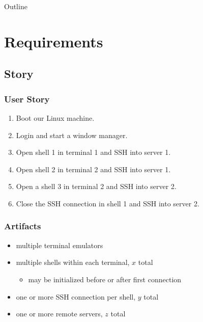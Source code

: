 \documentclass[]{beamer}
\title{\mytitle{}}
\author{Joe LaFreniere (lafrenierejm)}
\institute{Linux Users Group @ UT Dallas}
\date{2017-10-07}
\begin{document}
\maketitle
\begin{frame}{Outline}
  \tableofcontents
\end{frame}

\section{Requirements}
\subsection{Story}
\begin{frame}
  \frametitle{User Story}
  \begin{enumerate}
  \item<1|only@1>
    Boot our Linux machine.
  \item
    Login and start a window manager.
  \item
    Open shell 1 in terminal 1 and SSH into server 1.
  \item
    Open shell 2 in terminal 2 and SSH into server 1.
  \item
    Open a shell 3 in terminal 2 and SSH into server 2.
  \item
    Close the SSH connection in shell 1 and SSH into server 2.
  \end{enumerate}
\end{frame}

\begin{frame}
  \frametitle{Artifacts}
  \begin{itemize}
  \item
    multiple terminal emulators
  \item
    multiple shells within each terminal, \(x\) total
    \begin{itemize}
    \item
      may be initialized before or after first connection
    \end{itemize}
  \item
    one or more SSH connection per shell, \(y\) total
  \item
    one or more remote servers, \(z\) total
  \end{itemize}
\end{frame}
\end{document}
